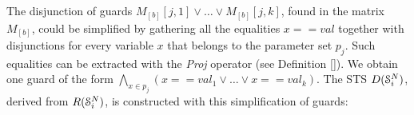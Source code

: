 %
%
%
%
%

The disjunction of guards $M_{[b]}[j,1] \vee \dots \vee
M_{[b]}[j,k]$, found in the matrix $M_{[b]}$, could be simplified
by gathering all the equalities $x==val$ together with
disjunctions for every variable $x$ that belongs to the parameter
set $p_j$. Such equalities can be extracted with the
\textit{Proj} operator (see Definition \ref{}). We
obtain one guard of the form $\bigwedge_{x \in p_j}(x==val_1 \vee
\dots \vee x==val_k)$. The STS $D(\EuScript{S}_i^{N})$, derived
from $R(\EuScript{S}_i^{N})$, is constructed with this
simplification of guards:


